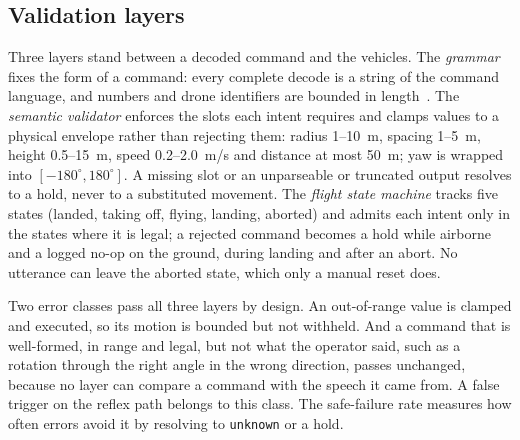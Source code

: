 \documentclass[a4paper,fleqn]{cas-dc}
\begin{document}
\subsection{Validation layers}
\label{sec:layers}

Three layers stand between a decoded command and the vehicles. The \emph{grammar} fixes the form of a
command: every complete decode is a string of the command language, and numbers and drone
identifiers are bounded in length~\citep{companion}. The \emph{semantic validator} enforces the
slots each intent requires and clamps values to a physical envelope rather than rejecting them:
radius 1--10~m, spacing 1--5~m, height 0.5--15~m, speed 0.2--2.0~m/s and distance at most 50~m;
yaw is wrapped into $[-180^\circ, 180^\circ]$. A missing slot or an unparseable or truncated output
resolves to a hold, never to a substituted movement. The \emph{flight state machine} tracks five
states (landed, taking off, flying, landing, aborted) and admits each intent only in the states where
it is legal; a rejected command becomes a hold while airborne and a logged no-op on the ground,
during landing and after an abort. No utterance can leave the aborted state, which only a manual
reset does.

Two error classes pass all three layers by design. An out-of-range value is clamped and executed,
so its motion is bounded but not withheld. And a command that is well-formed, in range and legal,
but not what the operator said, such as a rotation through the right angle in the wrong direction,
passes unchanged, because no layer can compare a command with the speech it came from. A false
trigger on the reflex path belongs to this class. The safe-failure rate measures how often errors
avoid it by resolving to \texttt{unknown} or a hold.

\subsection{}
\label{sec:hazard}
\end{document}
